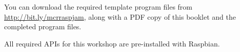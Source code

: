 You can download the required template program files from \url{http://bit.ly/mcrraspjam}, along with a PDF copy of this booklet and the completed program files.
			
All required APIs for this workshop are pre-installed with Raspbian.